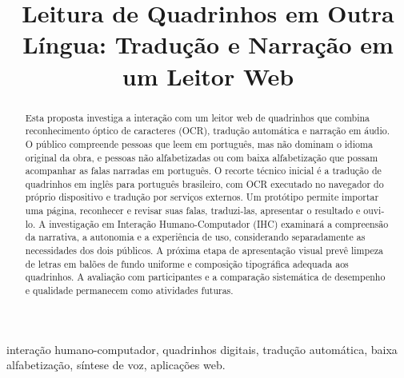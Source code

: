\documentclass[conference]{IEEEtran}
\begin{document}
\title{Leitura de Quadrinhos em Outra Língua: Tradução e Narração em um Leitor Web}

\author{
\and
{}
}
\maketitle

\begin{abstract}
Esta proposta investiga a interação com um leitor web de quadrinhos que combina reconhecimento óptico de caracteres (OCR), tradução automática e narração em áudio. O público compreende pessoas que leem em português, mas não dominam o idioma original da obra, e pessoas não alfabetizadas ou com baixa alfabetização que possam acompanhar as falas narradas em português. O recorte técnico inicial é a tradução de quadrinhos em inglês para português brasileiro, com OCR executado no navegador do próprio dispositivo e tradução por serviços externos. Um protótipo permite importar uma página, reconhecer e revisar suas falas, traduzi-las, apresentar o resultado e ouvi-lo. A investigação em Interação Humano-Computador (IHC) examinará a compreensão da narrativa, a autonomia e a experiência de uso, considerando separadamente as necessidades dos dois públicos. A próxima etapa de apresentação visual prevê limpeza de letras em balões de fundo uniforme e composição tipográfica adequada aos quadrinhos. A avaliação com participantes e a comparação sistemática de desempenho e qualidade permanecem como atividades futuras.
\end{abstract}

\begin{IEEEkeywords}
interação humano-computador, quadrinhos digitais, tradução automática, baixa alfabetização, síntese de voz, aplicações web.
\end{IEEEkeywords}
\end{document}
